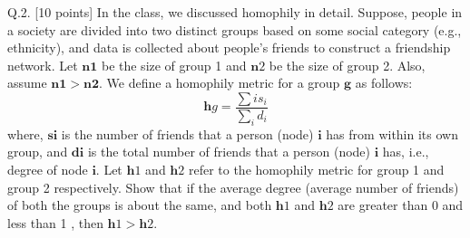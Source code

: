 \documentclass[answers]{exam}
\begin{document}
\begin{questions}
\begin{framed}
\end{framed}

\question Q.2. [10 points] In the class, we discussed homophily in detail. Suppose, people in a society are divided into two distinct groups based on some social category (e.g., ethnicity), and data is collected about people's friends to construct a friendship network.
Let $\boldsymbol{n}{\mathbf{1}}$ be the size of group 1 and $\boldsymbol{n}{2}$ be the size of group 2. Also, assume $\boldsymbol{n}{\mathbf{1}}>\boldsymbol{n}{\mathbf{2}}$. We define a homophily metric for a group $\boldsymbol{g}$ as follows:
$$
\boldsymbol{h}{g}=\frac{\sum{i} s_{i}}{\sum_{i} d_{i}}
$$
where,
$\boldsymbol{s}{\boldsymbol{i}}$ is the number of friends that a person (node) $\boldsymbol{i}$ has from within its own group, and $\boldsymbol{d}{\boldsymbol{i}}$ is the total number of friends that a person (node) $\boldsymbol{i}$ has, i.e., degree of node $\boldsymbol{i}$.
Let $\boldsymbol{h}{1}$ and $\boldsymbol{h}{2}$ refer to the homophily metric for group 1 and group 2 respectively.
Show that if the average degree (average number of friends) of both the groups is about the same, and both $\boldsymbol{h}{1}$ and $\boldsymbol{h}{2}$ are greater than 0 and less than 1 , then $\boldsymbol{h}{1}>\boldsymbol{h}{2}$.


\end{questions}
\end{document}
